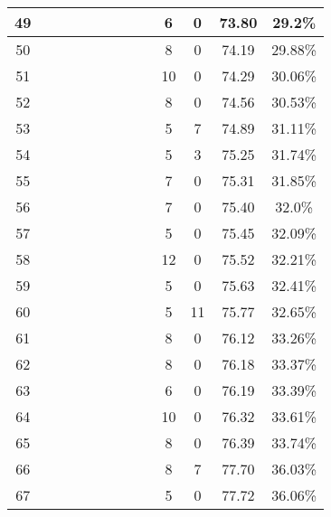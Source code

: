 \begin{longtable}{|c|c|c|c|c|c|c|c|c|c|c|c|c|}
49 &  \x    & \x    & \x    & \x    &       & \x    & \x\m  &       & 6 & 0 & 73.80 & 29.2\% \\ \hline
50 &  \x    & \x    & \x    & \x    &       & \x\m  & \x\m  &       & 8 & 0 & 74.19 & 29.88\% \\ \hline
51 &  \x    & \x    & \x    & \x    & \x    &       & \x\m  &       & 10 & 0 & 74.29 & 30.06\% \\ \hline
52 &  \x    & \x    & \x    &       & \x\m  & \x    &       &       & 8 & 0 & 74.56 & 30.53\% \\ \hline
53 &  \x    & \x    & \x    &       & \x    & \x\m  & \x\m  &       & 5 & 7 & 74.89 & 31.11\% \\ \hline
54 &  \x    & \x    & \x    &       & \x\m  & \x    &       & \x\m  & 5 & 3 & 75.25 & 31.74\% \\ \hline
55 &  \x    & \x    & \x    & \x    &       & \x\m  &       & \x\m  & 7 & 0 & 75.31 & 31.85\% \\ \hline
56 &  \x    & \x    & \x    & \x    & \x    & \x    & \x\m  &       & 7 & 0 & 75.40 & 32.0\% \\ \hline
57 &  \x    & \x    & \x    & \x    & \x    & \x\m  &       &       & 5 & 0 & 75.45 & 32.09\% \\ \hline
58 &  \x    & \x    & \x    &       &       &       &       & \x\m  & 12 & 0 & 75.52 & 32.21\% \\ \hline
59 &  \x    & \x    & \x    &       &       & \x    &       &       & 5 & 0 & 75.63 & 32.41\% \\ \hline
60 &  \x    & \x    & \x    &       & \x\m  &       &       &       & 5 & 11 & 75.77 & 32.65\% \\ \hline
61 &  \x    & \x    & \x    & \x    &       & \x\m  &       & \x\m  & 8 & 0 & 76.12 & 33.26\% \\ \hline
62 &  \x    & \x    & \x    & \x    &       &       & \x\m  &       & 8 & 0 & 76.18 & 33.37\% \\ \hline
63 &  \x    & \x    & \x    & \x    & \x    & \x\m  &       & \x\m  & 6 & 0 & 76.19 & 33.39\% \\ \hline
64 &  \x    & \x    & \x    &       &       &       &       &       & 10 & 0 & 76.32 & 33.61\% \\ \hline
65 &  \x    & \x    & \x    &       & \x    &       & \x\m  &       & 8 & 0 & 76.39 & 33.74\% \\ \hline
66 &  \x    & \x    & \x    & \x    & \x\m  &       & \x\m  &       & 8 & 7 & 77.70 & 36.03\% \\ \hline
67 &  \x    & \x    & \x    &       & \x\m  & \x    & \x    &       & 5 & 0 & 77.72 & 36.06\% \\ \hline

\end{longtable}
